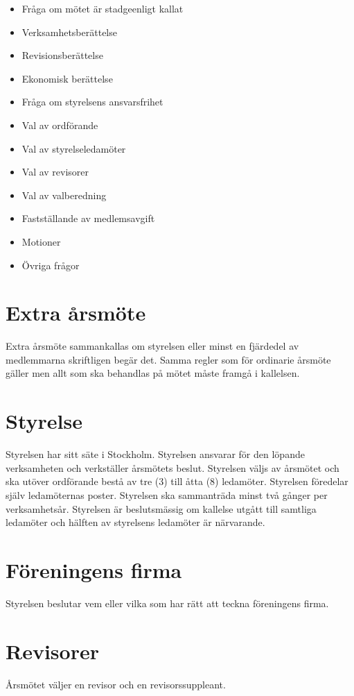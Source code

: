\documentclass[a4paper,11pt,oneside]{article}
\begin{document}
\begin{itemize}
  \item{Fråga om mötet är stadgeenligt kallat}
  \item{Verksamhetsberättelse}
  \item{Revisionsberättelse}
  \item{Ekonomisk berättelse}
  \item{Fråga om styrelsens ansvarsfrihet}
  \item{Val av ordförande}
  \item{Val av styrelseledamöter}
  \item{Val av revisorer}
  \item{Val av valberedning}
  \item{Fastställande av medlemsavgift}
  \item{Motioner}
  \item{Övriga frågor}
\end{itemize}

\section{Extra årsmöte}
Extra årsmöte sammankallas om styrelsen eller minst en fjärdedel av medlemmarna
skriftligen begär det. Samma regler som för ordinarie årsmöte gäller men allt
som ska behandlas på mötet måste framgå i kallelsen.

\section{Styrelse}
Styrelsen har sitt säte i Stockholm. Styrelsen ansvarar för den löpande
verksamheten och verkställer årsmötets beslut. Styrelsen väljs av årsmötet och
ska utöver ordförande bestå av tre (3) till åtta (8) ledamöter. Styrelsen
föredelar själv ledamöternas poster. Styrelsen ska sammanträda minst två gånger
per verksamhetsår. Styrelsen är beslutsmässig om kallelse utgått till samtliga
ledamöter och hälften av styrelsens ledamöter är närvarande.

\section{Föreningens firma}
Styrelsen beslutar vem eller vilka som har rätt att teckna föreningens firma.

\section{Revisorer}
Årsmötet väljer en revisor och en revisorssuppleant.
\end{document}
